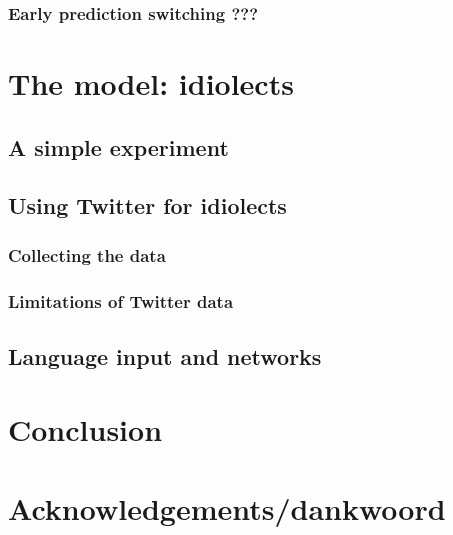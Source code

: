 \documentclass[12pt]{article}
\let\stdsection\section
\renewcommand\section{\newpage\stdsection}
\begin{document}
\subsubsection{Early prediction switching ???} \label{early}





\section{The model: idiolects} \label{model}

\subsection{A simple experiment}

\subsection{Using Twitter for idiolects}

\subsubsection{Collecting the data}

\subsubsection{Limitations of Twitter data}

\subsection{Language input and networks}

\section{Conclusion}


\section*{Acknowledgements/dankwoord}

\end{document}
